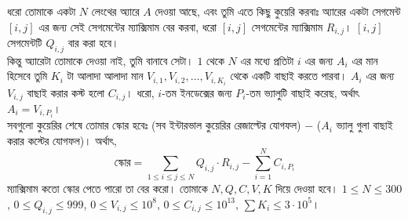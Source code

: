 \begin{example}
  ধরো তোমাকে একটা $N$ লেংথের অ্যারে $A$ দেওয়া আছে, এবং তুমি এতে কিছু কুয়েরি
  করবাঃ অ্যারের একটা সেগমেন্ট $[i, j]$ এর জন্য সেই সেগমেন্টের ম্যাক্সিমাম বের
  করবা, ধরো $[i, j]$ সেগমেন্টের ম্যাক্সিমাম $R_{i,j}$। $[i, j]$ সেগমেন্টটি
  $Q_{i, j}$ বার করা হবে।\\
  কিন্তু অ্যারেটা তোমাকে দেওয়া নাই, তুমি বানাবে সেটা। $1$ থেকে $N$ এর মধ্যে
  প্রতিটা $i$ এর জন্য $A_i$ এর মান হিসেবে তুমি $K_i$ টা আলাদা আলাদা মান
  $V_{i,1}, V_{i,2}, \ldots, V_{i, K_i}$ থেকে একটি বাছাই করতে পারবা। $A_i$ এর
  জন্য $V_{i, j}$ বাছাই করার কস্ট হলো $C_{i, j}$। ধরো, $i$-তম ইনডেক্সের জন্য
  $P_i$-তম ভ্যালুটি বাছাই করেছ, অর্থাৎ $A_i = V_{i,P_i}$।\\
  সবগুলো কুয়েরির শেষে তোমার স্কোর হবেঃ (সব ইন্টারভাল কুয়েরির রেজাল্টের যোগফল)
  $-$ ($A_i$ ভ্যালু গুলা বাছাই করার কস্টের যোগফল)। অর্থাৎ,
  \[
    \text{স্কোর} = \sum_{1 \le i \le j \le N} Q_{i,j} \cdot R_{i,j} - \sum_{i
    = 1}^{N} C_{i,P_i}
  \] ম্যাক্সিমাম কতো স্কোর পেতে পারো তা বের করো। তোমাকে $N, Q, C, V, K$ দিয়ে
  দেওয়া হবে। $1 \le N \le 300$, $0 \le Q_{i,j} \le 999$, $0 \leq V_{i, j}
  \leq 10^8$, $0 \leq C_{i, j} \leq 10^{13}$, $\sum K_i \le 3\cdot 10^5$।
\end{example}
